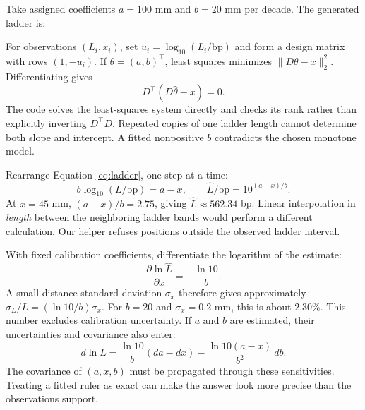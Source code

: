 Take assigned coefficients $a=100$ mm and $b=20$ mm per decade. The generated ladder is:
\begin{center}\end{center}


For observations $(L_i,x_i)$, set $u_i=\log_{10}(L_i/\mathrm{bp})$ and form a design matrix with rows $(1,-u_i)$. If $\theta=(a,b)^\top$, least squares minimizes $\|D\theta-x\|_2^2$. Differentiating gives
\begin{equation}
D^\top(D\widehat\theta-x)=0.
\end{equation}
The code solves the least-squares system directly and checks its rank rather than explicitly inverting $D^\top D$. Repeated copies of one ladder length cannot determine both slope and intercept. A fitted nonpositive $b$ contradicts the chosen monotone model.

Rearrange Equation \ref{eq:ladder}, one step at a time:
\begin{equation}
b\log_{10}(L/\mathrm{bp})=a-x,\qquad
\widehat L/\mathrm{bp}=10^{(a-x)/b}. \label{eq:size}
\end{equation}
At $x=45$ mm, $(a-x)/b=2.75$, giving $\widehat L\approx562.34$ bp. Linear interpolation in \emph{length} between the neighboring ladder bands would perform a different calculation. Our helper refuses positions outside the observed ladder interval.

With fixed calibration coefficients, differentiate the logarithm of the estimate:
\begin{equation}
\frac{\partial\ln\widehat L}{\partial x}=-\frac{\ln10}{b}.
\end{equation}
A small distance standard deviation $\sigma_x$ therefore gives approximately
$\sigma_L/L=(\ln10/b)\sigma_x$. For $b=20$ and $\sigma_x=0.2$ mm, this is about $2.30\%$. This number excludes calibration uncertainty. If $a$ and $b$ are estimated, their uncertainties and covariance also enter:
\begin{equation}
d\ln L=\frac{\ln10}{b}(da-dx)
-\frac{\ln10(a-x)}{b^2}\,db.
\end{equation}
The covariance of $(a,x,b)$ must be propagated through these sensitivities. Treating a fitted ruler as exact can make the answer look more precise than the observations support.


